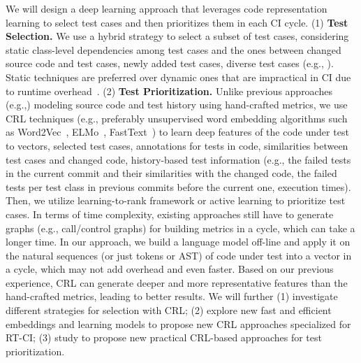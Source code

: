 We will design a deep learning approach that leverages code representation
learning to select test cases and then prioritizes them in
each CI cycle.  
(1) \textbf{Test Selection.}  We use a hybrid strategy to select a subset of test cases, considering
static class-level dependencies among test cases and the ones between
changed source code and test cases, newly added test cases, diverse
test cases (e.g., \cite{jiang2009adaptive,henard2016comparing}). 
Static techniques are preferred over dynamic ones that are impractical
in CI due to runtime overhead~\cite{bertolino2020learning}. 
(2) \textbf{Test Prioritization.} Unlike previous approaches
(e.g.,\cite{bertolino2020learning}) modeling source code and test
history using hand-crafted metrics, we use CRL techniques (e.g.,
preferably unsupervised word embedding algorithms such as
Word2Vec~\cite{word2vec}, ELMo~\cite{peters2019knowledge},
FastText~\cite{bojanowski2017enriching}) to learn deep features of the
code under test to vectors, selected test cases, annotations for tests in code, 
similarities between
test cases and changed code, history-based test information (e.g., the
failed tests in the current commit and their similarities with the
changed code, the failed tests per test class in previous commits
before the current one, execution times).  Then, we utilize
learning-to-rank framework or active learning to prioritize test cases. 
In terms of
time complexity, existing approaches still have to generate graphs
(e.g., call/control graphs) for building metrics in a cycle, which can
take a longer time. In our approach, we build a language model
off-line and apply it on the natural sequences (or just tokens or AST)
of code under test into a vector in a cycle, which may not add overhead and even faster.  
Based on our previous experience, CRL can generate deeper and more representative
features than the hand-crafted metrics, leading to better results. 
We will further (1) investigate different
strategies for selection with CRL; (2) explore new fast and efficient
embeddings and learning models to propose new CRL approaches
specialized for RT-CI; (3) study to propose new practical
CRL-based approaches for test prioritization.







